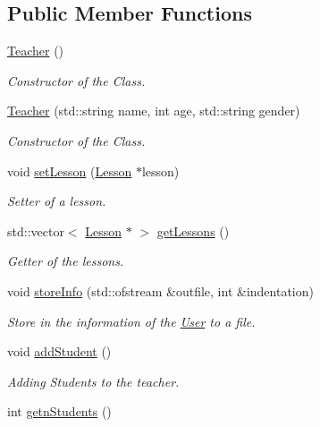 \subsection*{Public Member Functions}
\begin{DoxyCompactItemize}
\item 
\mbox{\hyperlink{class_teacher_a0d09b151c46e2abb647a2ae40cc5510c}{Teacher}} ()
\begin{DoxyCompactList}\small\item\em Constructor of the Class. \end{DoxyCompactList}\item 
\mbox{\hyperlink{class_teacher_adb308468e6ed8bbbffaba9cbf1ae646e}{Teacher}} (std\+::string name, int age, std\+::string gender)
\begin{DoxyCompactList}\small\item\em Constructor of the Class. \end{DoxyCompactList}\item 
void \mbox{\hyperlink{class_teacher_aec95be6f77dc2b692627a6f4a5385971}{set\+Lesson}} (\mbox{\hyperlink{class_lesson}{Lesson}} $\ast$lesson)
\begin{DoxyCompactList}\small\item\em Setter of a lesson. \end{DoxyCompactList}\item 
std\+::vector$<$ \mbox{\hyperlink{class_lesson}{Lesson}} $\ast$ $>$ \mbox{\hyperlink{class_teacher_a7782ce22f7e2313d89bceaeacec18dfb}{get\+Lessons}} ()
\begin{DoxyCompactList}\small\item\em Getter of the lessons. \end{DoxyCompactList}\item 
void \mbox{\hyperlink{class_teacher_a2ece0d60fa7ec4aaf93333aa0be0d25f}{store\+Info}} (std\+::ofstream \&outfile, int \&indentation)
\begin{DoxyCompactList}\small\item\em Store in the information of the \mbox{\hyperlink{class_user}{User}} to a file. \end{DoxyCompactList}\item 
void \mbox{\hyperlink{class_teacher_afd85dc703e8ddad28e298c1dcc697ee4}{add\+Student}} ()
\begin{DoxyCompactList}\small\item\em Adding Students to the teacher. \end{DoxyCompactList}\item 
int \mbox{\hyperlink{class_teacher_ae2e2666d5c8eceb29d6650d7b15958b1}{getn\+Students}} ()

\end{DoxyCompactItemize}
